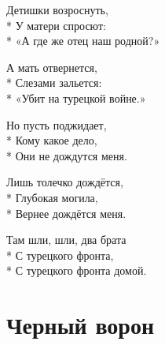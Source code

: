 \medskip

\begin{minipage}{\linewidth}
Детишки возроснуть,\\*
У матери спросют:\\*
«А где же отец наш родной?»\\
\end{minipage}\par\medskip\nobreak

\medskip

\begin{minipage}{\linewidth}
А мать отвернется,\\*
Слезами зальется:\\*
«Убит на турецкой войне.»\\
\end{minipage}\par\medskip\nobreak

\medskip

\begin{minipage}{\linewidth}
Но пусть поджидает,\\*
Кому какое дело,\\*
Они не дождутся меня.\\
\end{minipage}\par\medskip\nobreak

\medskip

\begin{minipage}{\linewidth}
Лишь толечко дождётся,\\*
Глубокая могила,\\*
Вернее дождётся меня.\\
\end{minipage}\par\medskip\nobreak

\medskip

\begin{minipage}{\linewidth}
Там шли, шли, два брата\\*
С турецкого фронта,\\*
С турецкого фронта домой.\\
\end{minipage}

\vspace{\fill}\newpage

\section{Черный ворон}
\label{song:Черный_ворон}

